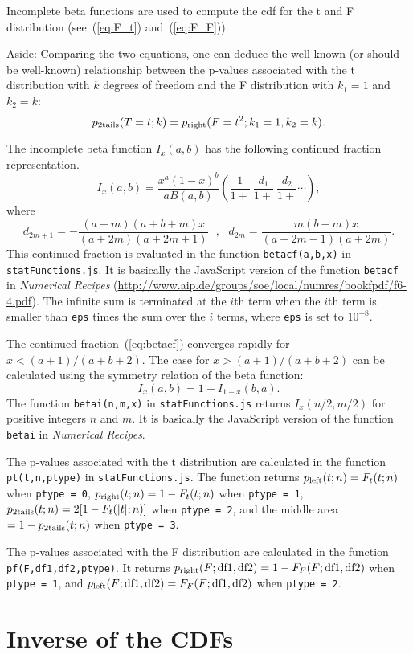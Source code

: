 \documentclass[12pt]{article}
\newcommand \beq {\begin{equation}}
\newcommand \eeq {\end{equation}}
\begin{document}
Incomplete beta functions are used to compute the cdf for the t and F distribution 
(see~(\ref{eq:F_t}) and~(\ref{eq:F_F})). 

Aside: Comparing the two equations, one can 
deduce the well-known (or should be well-known) relationship between the p-values 
associated with the t distribution with $k$ degrees of freedom and the F distribution 
with $k_1=1$ and $k_2=k$:
\beq
  p_{\rm 2tails}(T=t; k) = p_{\rm right}(F=t^2; k_1=1, k_2=k) .
\eeq

The incomplete beta function $I_x(a,b)$ has the following continued fraction 
representation. 
\beq
  I_x(a,b) = \frac{x^a (1-x)^b}{a B(a,b)} \left( \frac{1}{1+}\ \frac{d_1}{1+}\ 
\frac{d_2}{1+}\cdots \right) ,
\label{eq:betacf}
\eeq
where 
\beq
  d_{2m+1} = -\frac{(a+m)(a+b+m)x}{(a+2m)(a+2m+1)} \ \ \ , \ \ \ 
  d_{2m} = \frac{m(b-m)x}{(a+2m-1)(a+2m)} .
\eeq
This continued fraction is evaluated in the function {\tt betacf(a,b,x)} in 
{\tt statFunctions.js}. It is basically the JavaScript version of the 
function {\tt betacf} in {\it Numerical Recipes} 
(\url{http://www.aip.de/groups/soe/local/numres/bookfpdf/f6-4.pdf}). 
The infinite sum is terminated at the $i$th term when the $i$th term is 
smaller than {\tt eps} times the sum over the $i$ terms, where {\tt eps} 
is set to $10^{-8}$.

The continued fraction~(\ref{eq:betacf}) converges rapidly for $x<(a+1)/(a+b+2)$. 
The case for $x>(a+1)/(a+b+2)$ can be calculated using the symmetry relation of the 
beta function:
\beq
  I_x(a,b) = 1-I_{1-x}(b,a) .
\eeq
The function {\tt betai(n,m,x)} in {\tt statFunctions.js} returns 
$I_x(n/2,m/2)$ for positive integers $n$ and $m$. It is basically 
the JavaScript version of the function {\tt betai} in {\it Numerical Recipes}.

The p-values associated with the t distribution are calculated in 
the function {\tt pt(t,n,ptype)} in {\tt statFunctions.js}. The 
function returns $p_{\rm left}(t;n)=F_t(t;n)$ when {\tt ptype = 0}, 
$p_{\rm right}(t;n)=1-F_t(t;n)$ when {\tt ptype = 1}, 
$p_{\rm 2tails}(t;n)=2[1-F_t(|t|;n)]$ when {\tt ptype = 2}, 
and the middle area $=1-p_{\rm 2tails}(t;n)$ when {\tt ptype = 3}.

The p-values associated with the F distribution are calculated in
the function {\tt pf(F,df1,df2,ptype)}. It returns 
$p_{\rm right}(F; {\rm df1,df2})=1-F_F(F; {\rm df1,df2})$ when 
{\tt ptype = 1}, and $p_{\rm left}(F; {\rm df1,df2})=F_F(F; {\rm df1,df2})$ when 
{\tt ptype = 2}.

\section{Inverse of the CDFs} 
\end{document}
